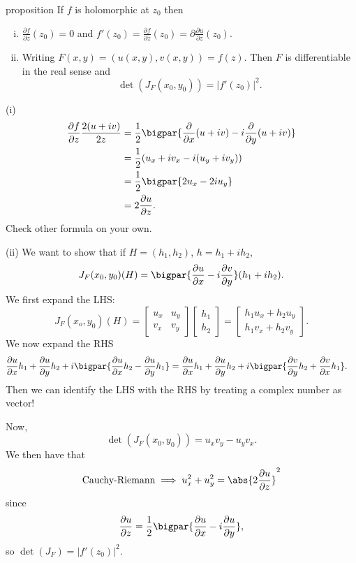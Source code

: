 \documentclass[class=article, crop=false]{standalone}
\begin{document}
\begin{result}{proposition}
  If $f$ is holomorphic at $z_0$ then
    \begin{enumerate}[(i)]
      \item $\frac{\partial f}{\partial \overline z}(z_0) = 0$ and $f'(z_0) = \frac{\partial f}{\partial z}(z_0) = \partial \frac{\partial u}{\partial z}(z_0)$.

      \item Writing $F(x,y) = (u(x,y),v(x,y))=f(z)$. Then $F$ is differentiable in the real sense and
        \[
          \det(J_F(x_0,y_0)) = |f'(z_0)|^2.
        \]
    \end{enumerate}
\end{result}
\begin{pf}
  (i)
    \begin{align*}
      \frac{\partial f}{\partial z} \frac{2(u+iv)}{2z} &= \frac{1}{2} \bigpar{\frac{\partial }{\partial x}(u+iv) - i \frac{\partial }{\partial y}(u+iv)}\\
        &= \frac{1}{2}(u_x+iv_x-i(u_y+iv_y)) \\
        &= \frac{1}{2} \bigpar{2u_x - 2iu_y} \\
        &= 2 \frac{\partial u}{\partial z}.
    \end{align*}
  Check other formula on your own.

  (ii) We want to show that if $H = (h_1,h_2)$, $h=h_1+ih_2$,
    \[
      J_F(x_0,y_0)(H) = \bigpar{\frac{\partial u}{\partial x}-i \frac{\partial v}{\partial y}}(h_1+ih_2).
    \]
    We first expand the LHS:
      \[
        J_F(x_o,y_0)(H) =
          \begin{bmatrix}
            u_x&u_y\\v_x&v_y
          \end{bmatrix}
          \begin{bmatrix}
            h_1\\h_2
          \end{bmatrix}
          =
          \begin{bmatrix}
            h_1u_x+h_2u_y \\
            h_1v_x+h_2v_y
          \end{bmatrix}.
      \]
    We now expand the RHS
      \begin{align*}
        \frac{\partial u}{\partial x}h_1 + \frac{\partial u}{\partial y}h_2 + i \bigpar{\frac{\partial u}{\partial x}h_2 - \frac{\partial u}{\partial y}h_1} &=
          \frac{\partial u}{\partial x}h_1 + \frac{\partial u}{\partial y}h_2 + i \bigpar{\frac{\partial v}{\partial y}h_2 + \frac{\partial v}{\partial x}h_1}.
      \end{align*}
    Then we can identify the LHS with the RHS by treating a complex number as vector!

    Now,
      \[
        \det(J_F(x_0,y_0)) = u_xv_y-u_yv_x.
      \]
    We then have that
      \[
        \text{Cauchy-Riemann} \implies u_x^2+u_y^2 = \abs{2 \frac{\partial u}{\partial z}}^2
      \]
    since
      \[
        \frac{\partial u}{\partial z}= \frac{1}{2} \bigpar{\frac{\partial u}{\partial x} - i \frac{\partial u}{\partial y}},
      \]
    so $\det(J_F) = |f'(z_0)|^2$.
\end{pf}
\end{document}
